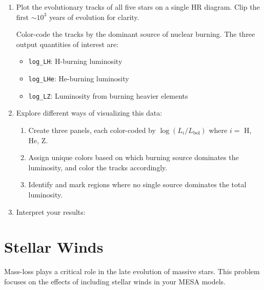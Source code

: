 \documentclass[11pt,a4paper]{article}
\begin{document}
\begin{enumerate}
    \item Plot the evolutionary tracks of all five stars on a single HR diagram. 
    Clip the first $\sim 10^3$ years of evolution for clarity.

    Color-code the tracks by the dominant source of nuclear burning. The three output quantities of interest are:
    \begin{itemize}
        \item \texttt{log\_LH}: H-burning luminosity
        \item \texttt{log\_LHe}: He-burning luminosity
        \item \texttt{log\_LZ}: Luminosity from burning heavier elements
    \end{itemize}
    \item Explore different ways of visualizing this data:
    \begin{enumerate}[label=(\alph*)]
        \item Create three panels, each color-coded by $\log (L_i/L_{\text{bol}})$ where $i = $ H, He, Z.
        \item Assign unique colors based on which burning source dominates the luminosity, and color the tracks accordingly.
        \item Identify and mark regions where no single source dominates the total luminosity.
    \end{enumerate}

    \item Interpret your results: 

\end{enumerate}

\section{Stellar Winds}

Mass-loss plays a critical role in the late evolution of massive stars. This problem focuses on the effects of including stellar winds in your MESA models.
\end{document}
